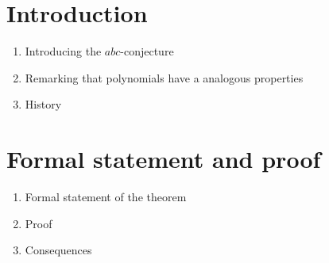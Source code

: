 \documentclass[11pt, a4paper, openany, oneside, article]{memoir}
\theoremstyle{definition}
\begin{document}
\title{}
\author{Pieter Belmans}
\maketitle

\section{Introduction}

\begin{enumerate}
  \item Introducing the $abc$-conjecture
  \item Remarking that polynomials have a analogous properties
  \item History
\end{enumerate}


\section{Formal statement and proof}

\begin{enumerate}
  \item Formal statement of the theorem
  \item Proof
  \item Consequences
\end{enumerate}
\end{document}
